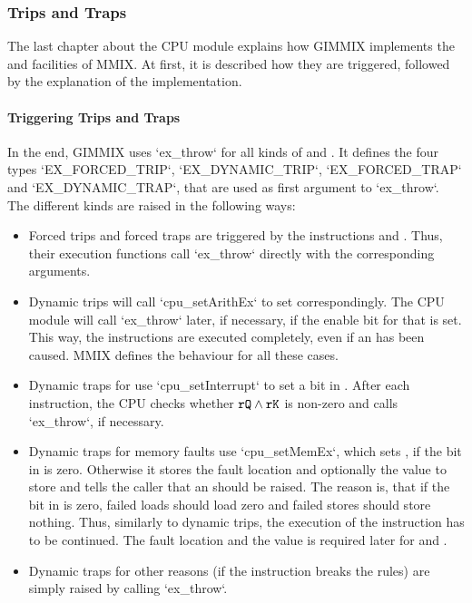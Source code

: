 \subsubsection{Trips and Traps}

The last chapter about the CPU module explains how GIMMIX implements the  and  facilities of MMIX. At first, it is described how they are triggered, followed by the explanation of the  implementation.

\paragraph{Triggering Trips and Traps}

In the end, GIMMIX uses `ex_throw` for all kinds of  and . It defines the four types `EX_FORCED_TRIP`, `EX_DYNAMIC_TRIP`, `EX_FORCED_TRAP` and `EX_DYNAMIC_TRAP`, that are used as first argument to `ex_throw`. The different kinds are raised in the following ways:
\begin{itemize}
	\item Forced trips and forced traps are triggered by the instructions  and . Thus, their execution functions call `ex_throw` directly with the corresponding arguments.
	\item Dynamic trips will call `cpu_setArithEx` to set  correspondingly. The CPU module will call `ex_throw` later, if necessary, \ie if the enable bit for that  is set. This way, the instructions are executed completely, even if an  has been caused. MMIX defines the behaviour for all these cases.
	\item Dynamic traps for  use `cpu_setInterrupt` to set a bit in . After each instruction, the CPU checks whether ${\tt rQ} \land {\tt rK}$ is non-zero and calls `ex_throw`, if necessary.
	\item Dynamic traps for memory faults use `cpu_setMemEx`, which sets , if the bit in  is zero. Otherwise it stores the fault location and optionally the value to store and tells the caller that an  should be raised. The reason is, that if the bit in  is zero, failed loads should load zero and failed stores should store nothing. Thus, similarly to dynamic trips, the execution of the instruction has to be continued. The fault location and the value is required later for  and .
	\item Dynamic traps for other reasons (\eg if the instruction breaks the rules) are simply raised by calling `ex_throw`.
\end{itemize}
